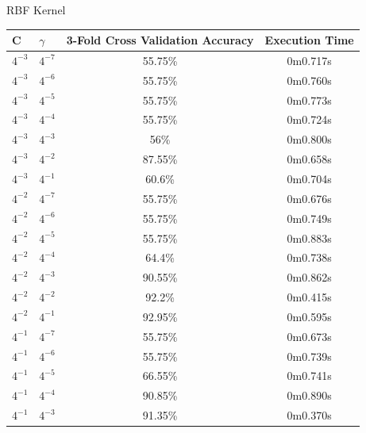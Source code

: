 \documentclass[]{report}
\begin{document}
		\newpage
	\begin{center}		
		RBF Kernel
			\begin{tabular}{l|l|c|c}
			\hline
			 C      & $\gamma$   & 3-Fold Cross Validation Accuracy   & Execution Time   \\
			\hline
			 $4^{-3}$ & $4^{-7}$   & 55.75\%                             & 0m0.717s         \\
			 $4^{-3}$ & $4^{-6}$   & 55.75\%                             & 0m0.760s         \\
			 $4^{-3}$ & $4^{-5}$   & 55.75\%                             & 0m0.773s         \\
			 $4^{-3}$ & $4^{-4}$   & 55.75\%                             & 0m0.724s         \\
			 $4^{-3}$ & $4^{-3}$   & 56\%                                & 0m0.800s         \\
			 $4^{-3}$ & $4^{-2}$   & 87.55\%                             & 0m0.658s         \\
			 $4^{-3}$ & $4^{-1}$   & 60.6\%                              & 0m0.704s         \\
			 $4^{-2}$ & $4^{-7}$   & 55.75\%                             & 0m0.676s         \\
			 $4^{-2}$ & $4^{-6}$   & 55.75\%                             & 0m0.749s         \\
			 $4^{-2}$ & $4^{-5}$   & 55.75\%                             & 0m0.883s         \\
			 $4^{-2}$ & $4^{-4}$   & 64.4\%                              & 0m0.738s         \\
			 $4^{-2}$ & $4^{-3}$   & 90.55\%                             & 0m0.862s         \\
			 $4^{-2}$ & $4^{-2}$   & 92.2\%                              & 0m0.415s         \\
			 $4^{-2}$ & $4^{-1}$   & 92.95\%                             & 0m0.595s         \\
			 $4^{-1}$ & $4^{-7}$   & 55.75\%                             & 0m0.673s         \\
			 $4^{-1}$ & $4^{-6}$   & 55.75\%                             & 0m0.739s         \\
			 $4^{-1}$ & $4^{-5}$   & 66.55\%                             & 0m0.741s         \\
			 $4^{-1}$ & $4^{-4}$   & 90.85\%                             & 0m0.890s         \\
			 $4^{-1}$ & $4^{-3}$   & 91.35\%                             & 0m0.370s         \\

\end{tabular}
\end{center}
\end{document}
